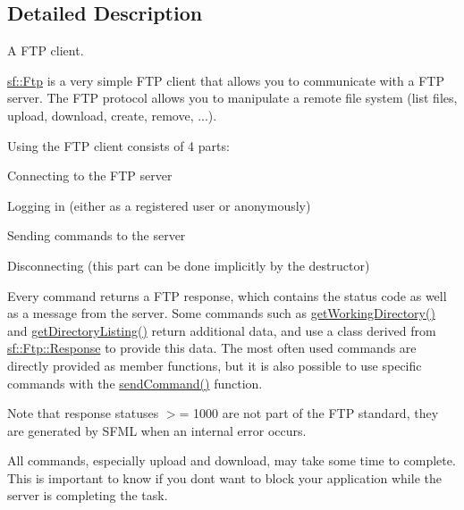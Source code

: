 \subsection{Detailed Description}
A F\+TP client. 

\begin{DoxyVerb}\end{DoxyVerb}


\mbox{\hyperlink{classsf_1_1_ftp}{sf\+::\+Ftp}} is a very simple F\+TP client that allows you to communicate with a F\+TP server. The F\+TP protocol allows you to manipulate a remote file system (list files, upload, download, create, remove, ...).

Using the F\+TP client consists of 4 parts\+: \begin{DoxyItemize}
\item Connecting to the F\+TP server \item Logging in (either as a registered user or anonymously) \item Sending commands to the server \item Disconnecting (this part can be done implicitly by the destructor)\end{DoxyItemize}
Every command returns a F\+TP response, which contains the status code as well as a message from the server. Some commands such as \mbox{\hyperlink{classsf_1_1_ftp_a79c654fcdd0c81e68c4fa29af3b45e0c}{get\+Working\+Directory()}} and \mbox{\hyperlink{classsf_1_1_ftp_a8f37258e461fcb9e2a0655e9df0be4a0}{get\+Directory\+Listing()}} return additional data, and use a class derived from \mbox{\hyperlink{classsf_1_1_ftp_1_1_response}{sf\+::\+Ftp\+::\+Response}} to provide this data. The most often used commands are directly provided as member functions, but it is also possible to use specific commands with the \mbox{\hyperlink{classsf_1_1_ftp_a44e095103ecbce175a33eaf0820440ff}{send\+Command()}} function.

Note that response statuses $>$= 1000 are not part of the F\+TP standard, they are generated by S\+F\+ML when an internal error occurs.

All commands, especially upload and download, may take some time to complete. This is important to know if you don\textquotesingle{}t want to block your application while the server is completing the task.

